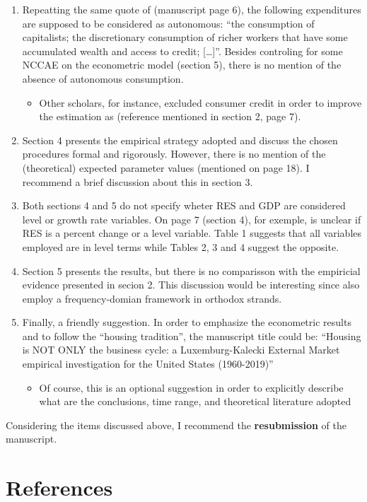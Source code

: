 \documentclass[11pt]{article}
\begin{document}
\begin{enumerate}
\item Repeatting the same quote  of \textcite[p.~71]{serrano_long_1995} (manuscript page 6), the following expenditures are supposed to be considered as autonomous: ``the consumption of capitalists; the discretionary consumption of richer workers that have some accumulated wealth and access to credit; [\ldots{}]''. Besides controling for some  NCCAE on the econometric model (section 5), there is no mention of the absence of autonomous consumption.

\begin{itemize}
\item Other scholars, for instance, excluded consumer credit in order to improve the estimation as \textcite{girardi_long-run_2016} (reference mentioned in section 2, page 7).
\end{itemize}

\item Section 4 presents the empirical strategy adopted and discuss the chosen procedures formal and rigorously.  However, there is no mention of the (theoretical) expected parameter values (mentioned on page 18). I recommend a brief discussion about this in section 3.

\item Both sections 4 and 5 do not specify wheter RES and GDP are considered level or growth rate variables. On page 7 (section 4), for exemple, is unclear if RES is a percent change or a level variable. Table 1 suggests that all variables employed are in level terms while Tables 2, 3 and 4 suggest  the opposite.

\item Section 5 presents the results, but there is no comparisson with the empiricial evidence presented in secion 2. This discussion would be interesting since \textcite{huang_is_2020} also employ a frequency-domian framework in orthodox strands.

\item Finally, a friendly suggestion. In order to emphasize the econometric results and to follow the ``housing tradition'', the manuscript title could be: ``Housing is NOT ONLY the business cycle: a Luxemburg-Kalecki External Market empirical investigation for the United States (1960-2019)''

\begin{itemize}
\item Of course, this is an optional suggestion in order to explicitly describe what are the conclusions, time range, and theoretical literature adopted
\end{itemize}
\end{enumerate}


Considering the items discussed above, I recommend the \textbf{resubmission} of the manuscript.

\section*{References}
\label{sec:orgee9c329}
\printbibliography[heading=none]
\end{document}

